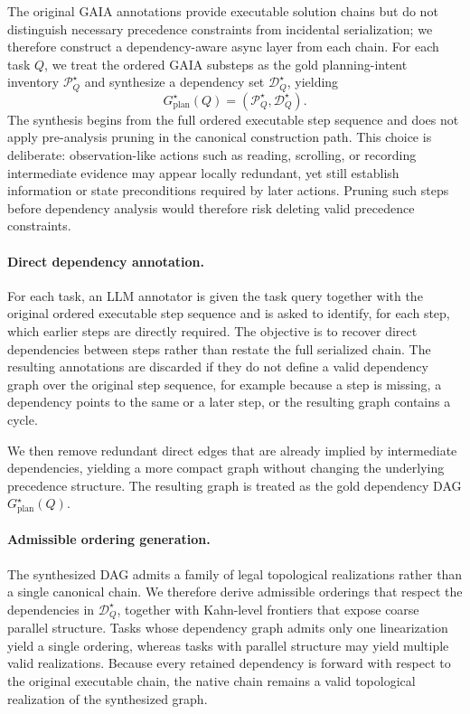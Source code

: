 \documentclass{article}
\begin{document}
The original GAIA annotations provide executable solution chains but do not distinguish necessary precedence constraints from incidental serialization; we therefore construct a dependency-aware async layer from each chain.
For each task \(Q\), we treat the ordered GAIA substeps as the gold planning-intent inventory \(\mathcal{P}_Q^\star\) and synthesize a dependency set \(\mathcal{D}_Q^\star\), yielding
\[
G_{\text{plan}}^\star(Q)
=
(\mathcal{P}_Q^\star,\mathcal{D}_Q^\star).
\]
The synthesis begins from the full ordered executable step sequence and does not apply pre-analysis pruning in the canonical construction path.
This choice is deliberate: observation-like actions such as reading, scrolling, or recording intermediate evidence may appear locally redundant, yet still establish information or state preconditions required by later actions.
Pruning such steps before dependency analysis would therefore risk deleting valid precedence constraints.

\paragraph{Direct dependency annotation.}
For each task, an LLM annotator is given the task query together with the original ordered executable step sequence and is asked to identify, for each step, which earlier steps are directly required.
The objective is to recover direct dependencies between steps rather than restate the full serialized chain.
The resulting annotations are discarded if they do not define a valid dependency graph over the original step sequence, for example because a step is missing, a dependency points to the same or a later step, or the resulting graph contains a cycle.

We then remove redundant direct edges that are already implied by intermediate dependencies, yielding a more compact graph without changing the underlying precedence structure.
The resulting graph is treated as the gold dependency DAG \(G_{\text{plan}}^\star(Q)\).

\paragraph{Admissible ordering generation.}
The synthesized DAG admits a family of legal topological realizations rather than a single canonical chain.
We therefore derive admissible orderings that respect the dependencies in \(\mathcal{D}_Q^\star\), together with Kahn-level frontiers that expose coarse parallel structure.
Tasks whose dependency graph admits only one linearization yield a single ordering, whereas tasks with parallel structure may yield multiple valid realizations.
Because every retained dependency is forward with respect to the original executable chain, the native chain remains a valid topological realization of the synthesized graph.
\end{document}

